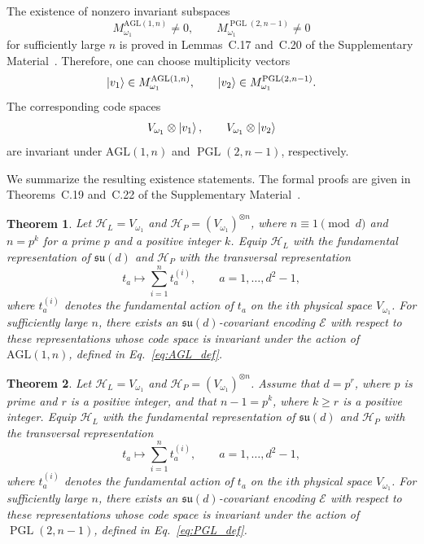 \documentclass[10pt,twocolumn,superscriptaddress,aps,amsmath,amssymb,citeautoscript,floatfix,prx,longbibliography]{revtex4-2}
\newtheorem{theorem}{Theorem}
\theoremstyle{plain}
\theoremstyle{plain}
\theoremstyle{plain}
\theoremstyle{plain}
\theoremstyle{plain}
\theoremstyle{plain}
\begin{document}
 The existence of nonzero invariant subspaces
$$
    M_{\omega_1}^{\mathrm{AGL}(1,n)}
    \neq
    0,
    \qquad
    M_{\omega_1}^{\operatorname{PGL}(2,n-1)}
    \neq
    0
$$
for sufficiently large $n$ is proved in Lemmas~C.17 and~C.20 of the Supplementary Material~\cite{SuppMat}. Therefore, one can choose multiplicity vectors
$$
    \ket{v_1}\in M_{\omega_1}^{\mathrm{AGL}(1,n)},
    \qquad
    \ket{v_2}\in M_{\omega_1}^{\operatorname{PGL}(2,n-1)}.
$$
The corresponding code spaces
$$
    V_{\omega_1}\otimes\ket{v_1},
    \qquad
    V_{\omega_1}\otimes\ket{v_2}
$$
are invariant under $\mathrm{AGL}(1,n)$ and $\operatorname{PGL}(2,n-1)$, respectively.

We summarize the resulting existence statements. The formal proofs are given in Theorems~C.19 and~C.22 of the Supplementary Material~\cite{SuppMat}.

\begin{theorem}\label{thrm:main_2_transitive_covariant_code}
Let $\mathcal H_L=V_{\omega_1}$ and $\mathcal H_P=(V_{\omega_1})^{\otimes n}$, where $n\equiv 1\pmod d$ and $n=p^k$ for a prime $p$ and a positive integer $k$. Equip $\mathcal H_L$ with the fundamental representation of $\mathfrak{su}(d)$ and $\mathcal H_P$ with the transversal representation
$$
    t_a
    \longmapsto
    \sum_{i=1}^n t_a^{(i)},
    \qquad
    a=1,\ldots,d^2-1,
$$
where $t_a^{(i)}$ denotes the fundamental action of $t_a$ on the $i$th physical space $V_{\omega_1}$. For sufficiently large $n$, there exists an $\mathfrak{su}(d)$-covariant encoding $\mathcal E$ with respect to these representations whose code space is invariant under the action of $\mathrm{AGL}(1,n)$, defined in Eq.~\eqref{eq:AGL_def}.
\end{theorem}

\begin{theorem}\label{thrm:main_3_transitive_covariant_code}
Let $\mathcal H_L=V_{\omega_1}$ and $\mathcal H_P=(V_{\omega_1})^{\otimes n}$. Assume that $d=p^r$, where $p$ is prime and $r$ is a positive integer, and that $n-1=p^k$, where $k\ge r$ is a positive integer. Equip $\mathcal H_L$ with the fundamental representation of $\mathfrak{su}(d)$ and $\mathcal H_P$ with the transversal representation
$$
    t_a
    \longmapsto
    \sum_{i=1}^n t_a^{(i)},
    \qquad
    a=1,\ldots,d^2-1,
$$
where $t_a^{(i)}$ denotes the fundamental action of $t_a$ on the $i$th physical space $V_{\omega_1}$. For sufficiently large $n$, there exists an $\mathfrak{su}(d)$-covariant encoding $\mathcal E$ with respect to these representations whose code space is invariant under the action of $\operatorname{PGL}(2,n-1)$, defined in Eq.~\eqref{eq:PGL_def}.
\end{theorem}
\end{document}
